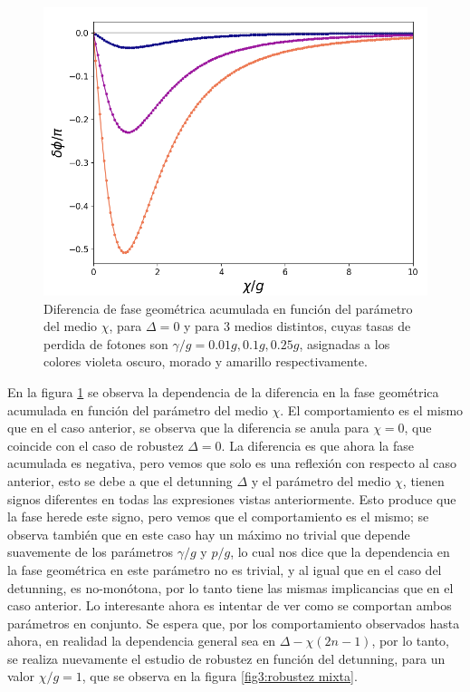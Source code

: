 \begin{figure}[H]
    \begin{minipage}[c]{0.67\textwidth}
        \includegraphics[width=\textwidth]{figuras/ch3/robustez kerr.png}
    \end{minipage}\hfill
    \begin{minipage}[c]{0.3\textwidth}
    \caption{Diferencia de fase geométrica acumulada en función del parámetro del medio $\chi$, para $\Delta=0$ y para 3 medios distintos, cuyas tasas de perdida de fotones son $\gamma/g=0.01g,0.1g,0.25g$, asignadas a los colores violeta oscuro, morado y amarillo respectivamente.
         } \label{fig3:robustez kerr}
  \end{minipage}
\end{figure}
En la figura \ref{fig3:robustez kerr} se observa la dependencia de la diferencia en la fase geométrica acumulada en función del parámetro del medio $\chi$. El comportamiento es el mismo que en el caso anterior, se observa que la diferencia se anula para $\chi=0$, que coincide con el caso de robustez $\Delta=0$. La diferencia es que ahora la fase acumulada es negativa, pero vemos que solo es una reflexión con respecto al caso anterior, esto se debe a que el detunning $\Delta$ y el parámetro del medio $\chi$, tienen signos diferentes en todas las expresiones vistas anteriormente. Esto produce que la fase herede este signo, pero vemos que el comportamiento es el mismo; se observa también que en este caso hay un máximo no trivial que depende suavemente de los parámetros $\gamma/g$ y $p/g$, lo cual nos dice que la dependencia en la fase geométrica en este parámetro no es trivial, y al igual que en el caso del detunning, es no-monótona, por lo tanto tiene las mismas implicancias que en el caso anterior. Lo interesante ahora es intentar de ver como se comportan ambos parámetros en conjunto. Se espera que, por los comportamiento observados hasta ahora, en realidad la dependencia general sea en $\Delta-\chi(2n-1)$, por lo tanto, se realiza nuevamente el estudio de robustez en función del detunning, para un valor $\chi/g=1$, que se observa en la figura \ref{fig3:robustez mixta}.
